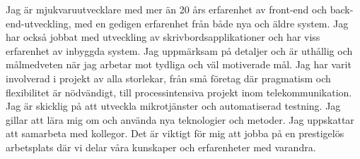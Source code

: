 \documentclass{cv-stylish}
\begin{document}
\begin{center} %



\vspace{1.0cm} %



\begin{adjustwidth}{1cm}{1cm}


Jag är mjukvaruutvecklare med mer än 20 års erfarenhet av
front-end och back-end-utveckling, med en gedigen erfarenhet
från både nya och äldre system.
Jag har också jobbat med utveckling av skrivbordsapplikationer och har
viss erfarenhet av inbyggda system.
Jag uppmärksam på
detaljer och är uthållig och målmedveten när jag arbetar mot
tydliga och väl motiverade mål. Jag har varit involverad i projekt av
alla storlekar, från små företag där pragmatism och flexibilitet
är nödvändigt, till processintensiva projekt inom telekommunikation.
Jag är skicklig på att utveckla mikrotjänster och automatiserad
testning. Jag gillar att lära mig om och använda nya teknologier
och metoder. Jag uppskattar att samarbeta med kollegor. Det är
viktigt för mig att jobba på en prestigelös arbetsplats där vi delar
våra kunskaper och erfarenheter med varandra.




\end{adjustwidth}
\end{center}
\end{document}
